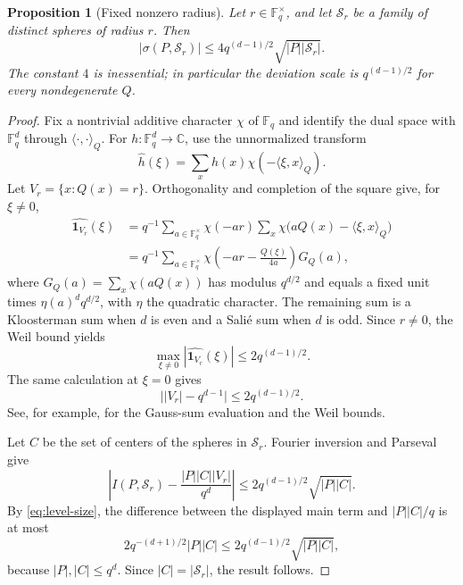 \documentclass[11pt,letterpaper]{amsart}
\newtheorem{proposition}[proposition]{Proposition}
\theoremstyle{definition}
\theoremstyle{remark}
\newcommand{\1}{\mathbf 1}
\newcommand{\ip}[2]{\langle #1,#2\rangle_Q}
\begin{document}
\begin{proposition}[Fixed nonzero radius]\label{prop:fixed-radius}
Let $r\in\mathbb F_q^\times$, and let $\mathcal S_r$ be a family of distinct spheres of radius $r$.  Then
\begin{equation}\label{eq:fixed-radius-bound}
 |\sigma(P,\mathcal S_r)|
 \le 4q^{(d-1)/2}\sqrt{|P||\mathcal S_r|}.
\end{equation}
The constant $4$ is inessential; in particular the deviation scale is $q^{(d-1)/2}$ for every nondegenerate $Q$.
\end{proposition}

\begin{proof}
Fix a nontrivial additive character $\chi$ of $\mathbb F_q$ and identify the dual space with $\mathbb F_q^d$ through $\langle\cdot,\cdot\rangle_Q$.  For $h:\mathbb F_q^d\to\mathbb C$, use the unnormalized transform
\[
 \widehat h(\xi)=\sum_x h(x)\chi(-\ip{\xi}{x}).
\]
Let $V_r=\{x:Q(x)=r\}$.  Orthogonality and completion of the square give, for $\xi\ne0$,
\begin{align*}
 \widehat{\1_{V_r}}(\xi)
 &=q^{-1}\sum_{a\in\mathbb F_q^\times}\chi(-ar)
   \sum_x\chi\bigl(aQ(x)-\ip{\xi}{x}\bigr)\\
 &=q^{-1}\sum_{a\in\mathbb F_q^\times}\chi\left(-ar-\frac{Q(\xi)}{4a}\right)G_Q(a),
\end{align*}
where $G_Q(a)=\sum_x\chi(aQ(x))$ has modulus $q^{d/2}$ and equals a fixed unit times $\eta(a)^d q^{d/2}$, with $\eta$ the quadratic character.  The remaining sum is a Kloosterman sum when $d$ is even and a Sali\'e sum when $d$ is odd.  Since $r\ne0$, the Weil bound yields
\begin{equation}\label{eq:fixed-fourier}
 \max_{\xi\ne0}|\widehat{\1_{V_r}}(\xi)|
 \le2q^{(d-1)/2}.
\end{equation}
The same calculation at $\xi=0$ gives
\begin{equation}\label{eq:level-size}
 \bigl||V_r|-q^{d-1}\bigr|\le2q^{(d-1)/2}.
\end{equation}
See, for example, \cite[Chapters~5--6]{LN} for the Gauss-sum evaluation and the Weil bounds.

Let $C$ be the set of centers of the spheres in $\mathcal S_r$.  Fourier inversion and Parseval give
\[
 \left|I(P,\mathcal S_r)-\frac{|P||C||V_r|}{q^d}\right|
 \le2q^{(d-1)/2}\sqrt{|P||C|}.
\]
By \eqref{eq:level-size}, the difference between the displayed main term and $|P||C|/q$ is at most
\[
 2q^{-(d+1)/2}|P||C|
 \le2q^{(d-1)/2}\sqrt{|P||C|},
\]
because $|P|,|C|\le q^d$.  Since $|C|=|\mathcal S_r|$, the result follows.
\end{proof}
\end{document}
